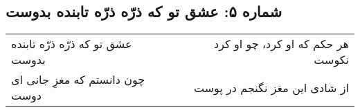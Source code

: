 \begin{center}
\section*{شماره ۵: عشق تو که ذرّه ذرّه تابنده بدوست}
\label{sec:005}
\begin{longtable}{l p{0.5cm} r}
عشق تو که ذرّه ذرّه تابنده بدوست
&&
هر حکم که او کرد، چو او کرد نکوست
\\
چون دانستم که مغزِ جانی ای دوست
&&
از شادی این مغز نگنجم در پوست
\\
\end{longtable}
\end{center}
